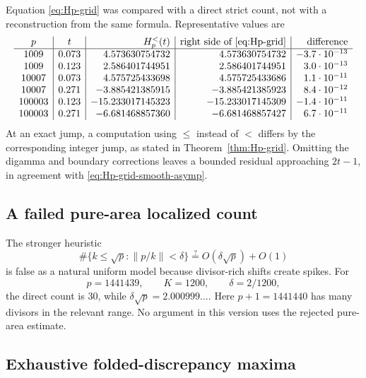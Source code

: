\documentclass[11pt]{amsart}
\numberwithin{equation}{section}
\theoremstyle{definition}
\theoremstyle{remark}
\begin{document}
Equation \eqref{eq:Hp-grid} was compared with a direct strict count, not
with a reconstruction from the same formula.  Representative values are
\[
\begin{array}{c|c|r|r|r}
 p&t&H_p^{<}(t)&\text{right side of \eqref{eq:Hp-grid}}&\text{difference}\\ \hline
1009&0.073& 4.573630754732& 4.573630754732&-3.7\cdot10^{-13}\\
1009&0.123& 2.586401744951& 2.586401744951& 3.0\cdot10^{-13}\\
10007&0.073&4.575725433698&4.575725433686&1.1\cdot10^{-11}\\
10007&0.271&-3.885421385915&-3.885421385923&8.4\cdot10^{-12}\\
100003&0.123&-15.233017145323&-15.233017145309&-1.4\cdot10^{-11}\\
100003&0.271&-6.681468857360&-6.681468857427&6.7\cdot10^{-11}
\end{array}
\]
At an exact jump, a computation using \(\le\) instead of \(<\) differs by
the corresponding integer jump, as stated in
Theorem~\ref{thm:Hp-grid}.  Omitting the digamma and boundary corrections
leaves a bounded residual approaching \(2t-1\), in agreement with
\eqref{eq:Hp-grid-smooth-asymp}.

\subsection{A failed pure-area localized count}

The stronger heuristic
\[
 \#\{k\le\sqrt p:\|p/k\|<\delta\}
 \stackrel{?}{=}O(\delta\sqrt p)+O(1)
\]
is false as a natural uniform model because divisor-rich shifts create
spikes.  For
\[
 p=1441439,\qquad K=1200,\qquad \delta=2/1200,
\]
the direct count is \(30\), while \(\delta\sqrt p=2.000999\ldots\).
Here \(p+1=1441440\) has many divisors in the relevant range.  No argument
in this version uses the rejected pure-area estimate.

\subsection{Exhaustive folded-discrepancy maxima}
\end{document}
